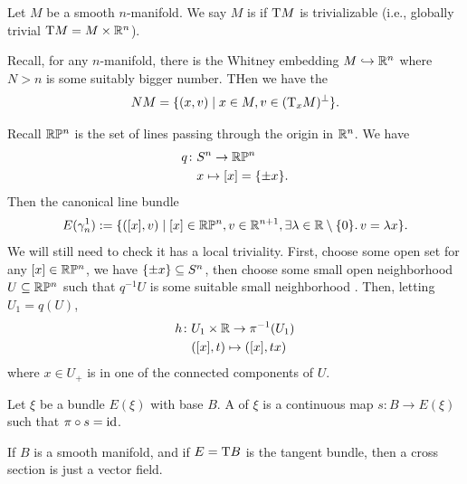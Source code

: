 \begin{definition}
Let $M$ be a smooth $n$-manifold.
We say $M$ is  if $\mathrm{T} M$
is trivializable (i.e., globally trivial $\mathrm{T} M=M\times\mathbb{R}^{n}$).
\end{definition}

\begin{example}
Recall, for any $n$-manifold, there is the Whitney embedding
$M\hookrightarrow\mathbb{R}^{n}$ where $N>n$ is some suitably bigger number. THen we
have the 
\begin{equation}
NM = \{(x,v)\mid x\in M,v\in(\mathrm{T}_{x}M)^{\perp}\}.
\end{equation}
\end{example}

\begin{example}
Recall $\mathbb{R}\mathbb{P}^{n}$ is the set of lines passing through the origin in
$\mathbb{R}^{n}$. We have
\begin{align*}
q\colon & S^{n}\to\mathbb{R}\mathbb{P}^{n}\\
& x\mapsto[x]=\{\pm x\}.
\end{align*}
Then the canonical line bundle
\begin{equation}
E(\gamma^{1}_{n}):=\{([x],v)\mid [x]\in\mathbb{R}\mathbb{P}^{n},v\in\mathbb{R}^{n+1},\exists\lambda\in\mathbb{R}\setminus\{0\}\ldotp
v=\lambda x\}.
\end{equation}
We will still need to check it has a local triviality. First, choose
some open set for any $[x]\in\mathbb{R}\mathbb{P}^{n}$, we have $\{\pm x\}\subseteq S^{n}$,
then choose some small open neighborhood $U\subseteq\mathbb{R}\mathbb{P}^{n}$ such that
$q^{-1}U$ is some suitable small neighborhood . Then, letting $U_{1}=q(U)$,
\begin{align*}
h\colon & U_{1}\times\mathbb{R}\to\pi^{-1}(U_{1})\\
& ([x],t)\mapsto([x],tx)
\end{align*}
where $x\in U_{+}$ is in one of the connected components of $U$.
\end{example}

\begin{definition}
Let $\xi$ be a bundle $E(\xi)$ with base $B$.
A  of $\xi$ is a continuous map $s\colon B\to E(\xi)$
such that $\pi\circ s=\operatorname{id}$.
\end{definition}

\begin{remark}
If $B$ is a smooth manifold, and if $E=\mathrm{T} B$ is the tangent bundle,
then a cross section is just a vector field.
\end{remark}

